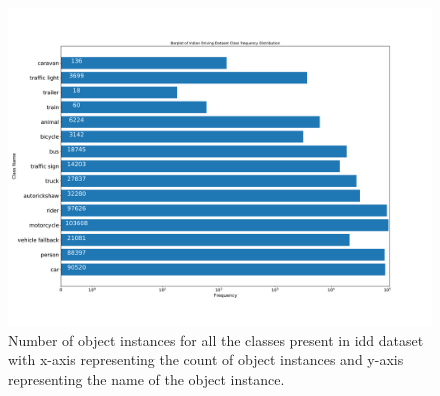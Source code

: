     \begin{figure}[H]
        \centering
        \includegraphics[scale=0.35]{images/Indian_Driving_Dataset_Class_frequency.pdf}
        \caption[Instance count of \acrshort{idd} dataset]{Number of object instances for all the classes present in \acrshort{idd} dataset with x-axis representing the count of object instances and y-axis representing the name of the object instance.}
        \label{fig:IDD_EDA}
    \end{figure} 
    
